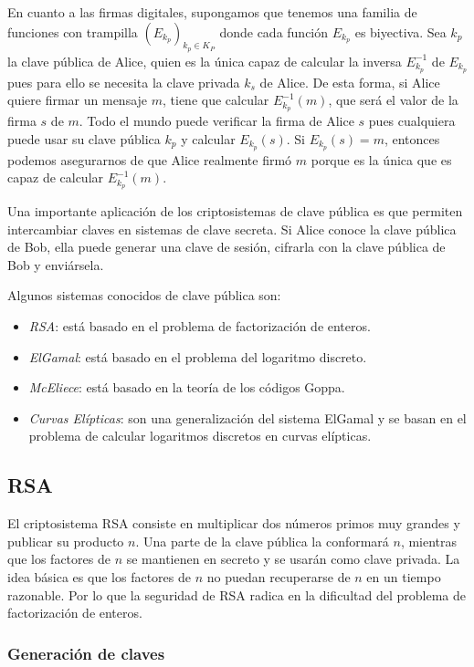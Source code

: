 En cuanto a las firmas digitales, supongamos que tenemos una familia de funciones con trampilla $\left( E_{k_p} \right)_{k_p \in K_P}$ donde cada función $E_{k_p}$ es biyectiva. Sea $k_p$ la clave pública de Alice, quien es la única capaz de calcular la inversa $E_{k_p}^{-1}$ de $E_{k_p}$ pues para ello se necesita la clave privada $k_s$ de Alice. De esta forma, si Alice quiere firmar un mensaje $m$, tiene que calcular $E_{k_p}^{-1}(m)$, que será el valor de la firma $s$ de $m$. Todo el mundo puede verificar la firma de Alice $s$ pues cualquiera puede usar su clave pública $k_p$ y calcular $E_{k_p}(s)$. Si $E_{k_p} (s) = m$, entonces podemos asegurarnos de que Alice realmente firmó $m$ porque es la única que es capaz de calcular $E_{k_p}^{-1}(m)$.

Una importante aplicación de los criptosistemas de clave pública es que permiten intercambiar claves en sistemas de clave secreta. Si Alice conoce la clave pública de Bob, ella puede generar una clave de sesión, cifrarla con la clave pública de Bob y enviársela.  

Algunos sistemas conocidos de clave pública son:

\begin{itemize}
    \item \emph{RSA}: está basado en el problema de factorización de enteros.
    \item \emph{ElGamal}: está basado en el problema del logaritmo discreto.
    \item \emph{McEliece}: está basado en la teoría de los códigos Goppa.
    \item \emph{Curvas Elípticas}: son una generalización del sistema ElGamal y se basan en el problema de calcular logaritmos discretos en curvas elípticas.
\end{itemize}

\subsection{RSA}

El criptosistema RSA consiste en multiplicar dos números primos muy grandes y publicar su producto $n$. Una parte de la clave pública la conformará $n$, mientras que los factores de $n$ se mantienen en secreto y se usarán como clave privada. La idea básica es que los factores de $n$ no puedan recuperarse de $n$ en un tiempo razonable. Por lo que la seguridad de RSA radica en la dificultad del problema de factorización de enteros.

\subsubsection{Generación de claves}

